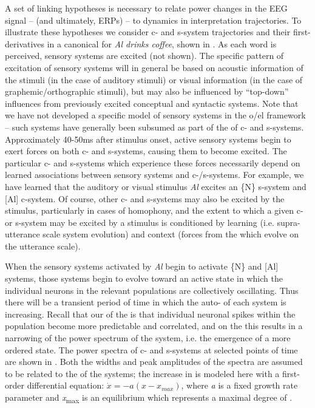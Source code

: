 A set of linking hypotheses is necessary to relate power changes in the EEG signal -- (and ultimately, ERPs) -- to  dynamics in interpretation trajectories. To illustrate these hypotheses we consider c- and s-system  trajectories and their first-derivatives in a canonical  for \textit{Al drinks coffee}, shown in {}. As each word is perceived, sensory systems are excited (not shown). The specific pattern of excitation of sensory systems will in general be based on acoustic information of the stimuli (in the case of auditory stimuli) or visual information (in the case of graphemic/orthographic stimuli), but may also be influenced by “top-down” influences from previously excited conceptual and syntactic systems. Note that we have not developed a specific model of sensory systems in the o/el framework -- such systems have generally been subsumed as part of the  of c- and s-systems. Approximately 40-50ms after stimulus onset, active sensory systems begin to exert forces on both c- and s-systems, causing them to become excited. The particular c- and s-systems which experience these forces necessarily depend on learned associations between sensory systems and c-/s-systems. For example, we have learned that the auditory or visual stimulus \textit{Al} excites an \{N\} s-system and [Al] c-system. Of course, other c- and s-systems may also be excited by the stimulus, particularly in cases of homophony, and the extent to which a given c- or s-system may be excited by a stimulus is conditioned by learning (i.e. supra-utterance scale system evolution) and context (forces from the  which evolve on the utterance scale).

  When the sensory systems activated by \textit{Al} begin to activate \{N\} and [Al] systems, those systems begin to evolve toward an active state in which the individual neurons in the relevant populations are collectively oscillating. Thus there will be a transient period of time in which the auto- of each system is increasing. Recall that our  of the  is that individual neuronal spikes within the population become more predictable and correlated, and on the  this results in a narrowing of the power spectrum of the system, i.e. the emergence of a more ordered state. The power spectra of c- and s-systems at selected points of time are shown in {}. Both the widths and peak amplitudes of the spectra are assumed to be related to the  of the systems; the increase in  is modeled here with a first-order differential equation:  $\dot{{x}}=-a\left(x-{x}_{\mathit{max}}\right)$, where \textit{a} is a fixed growth rate parameter and \textit{x}\textsubscript{max} is an equilibrium which represents a maximal degree of . 

